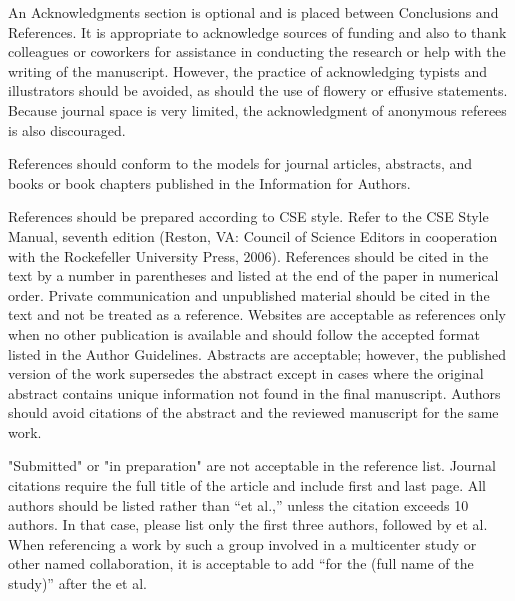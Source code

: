 \documentclass[11pt]{article}
\begin{document}
An Acknowledgments section is optional and is placed between Conclusions and References. It is appropriate to acknowledge sources of funding and also to thank colleagues or coworkers for assistance in conducting the research or help with the writing of the manuscript. However, the practice of acknowledging typists and illustrators should be avoided, as should the use of flowery or effusive statements. Because journal space is very limited, the acknowledgment of anonymous referees is also discouraged.




%  



References should conform to the models for journal articles, abstracts, and books or book chapters published in the Information for Authors.

References should be prepared according to CSE style. Refer to the CSE Style Manual, seventh edition (Reston, VA: Council of Science Editors in cooperation with the Rockefeller University Press, 2006). References should be cited in the text by a number in parentheses and listed at the end of the paper in numerical order. Private communication and unpublished material should be cited in the text and not be treated as a reference. Websites are acceptable as references only when no other publication is available and should follow the accepted format listed in the Author Guidelines. Abstracts are acceptable; however, the published version of the work supersedes the abstract except in cases where the original abstract contains unique information not found in the final manuscript. Authors should avoid citations of the abstract and the reviewed manuscript for the same work.

"Submitted" or "in preparation" are not acceptable in the reference list. Journal citations require the full title of the article and include first and last page. All authors should be listed rather than “et al.,” unless the citation exceeds 10 authors. In that case, please list only the first three authors, followed by et al.  When referencing a work by such a group involved in a multicenter study or other named collaboration, it is acceptable to add “for the (full name of the study)” after the et al.
\end{document}
